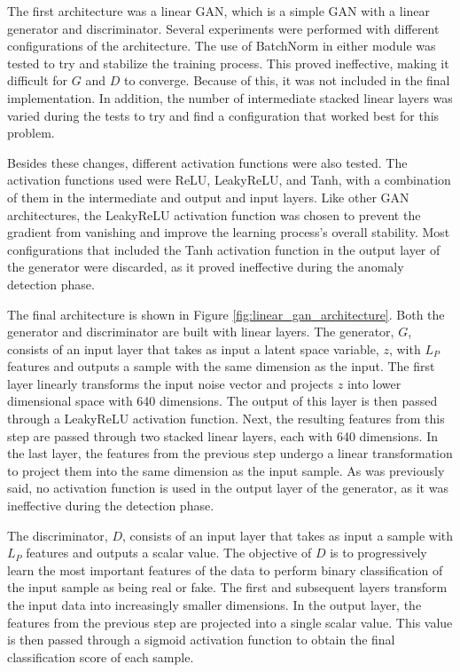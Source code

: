 The first architecture was a linear GAN, which is a simple GAN with a linear generator and discriminator. Several experiments were performed with different configurations of the architecture. The use of BatchNorm in either module was tested to try and stabilize the training process. This proved ineffective, making it difficult for $G$ and $D$ to converge. Because of this, it was not included in the final implementation. In addition, the number of intermediate stacked linear layers was varied during the tests to try and find a configuration that worked best for this problem. 

Besides these changes, different activation functions were also tested. The activation functions used were ReLU, LeakyReLU, and Tanh, with a combination of them in the intermediate and output and input layers. Like other GAN architectures, the LeakyReLU activation function was chosen to prevent the gradient from vanishing and improve the learning process's overall stability. Most configurations that included the Tanh activation function in the output layer of the generator were discarded, as it proved ineffective during the anomaly detection phase.

The final architecture is shown in Figure \ref{fig:linear_gan_architecture}. Both the generator and discriminator are built with linear layers. The generator, $G$, consists of an input layer that takes as input a latent space variable, $z$, with $L_P$ features and outputs a sample with the same dimension as the input. The first layer linearly transforms the input noise vector and projects $z$ into lower dimensional space with 640 dimensions. The output of this layer is then passed through a LeakyReLU activation function. Next, the resulting features from this step are passed through two stacked linear layers, each with 640 dimensions. In the last layer, the features from the previous step undergo a linear transformation to project them into the same dimension as the input sample. As was previously said, no activation function is used in the output layer of the generator, as it was ineffective during the detection phase.

The discriminator, $D$, consists of an input layer that takes as input a sample with $L_P$ features and outputs a scalar value. The objective of $D$ is to progressively learn the most important features of the data to perform binary classification of the input sample as being real or fake. The first and subsequent layers transform the input data into increasingly smaller dimensions. In the output layer, the features from the previous step are projected into a single scalar value. This value is then passed through a sigmoid activation function to obtain the final classification score of each sample.

